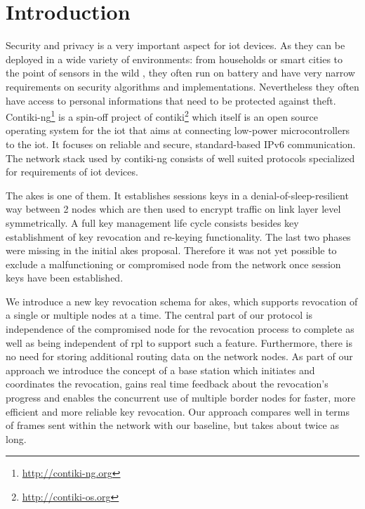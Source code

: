 \documentclass[conference]{IEEEtran}
\newcommand{\inlinetodo}[2][]{\todo[inline,caption={},#1]{#2}}
\begin{document}
\section{Introduction}\label{sec:introduction}
Security and privacy is a very important aspect for \ac{iot} devices. 
As they can be deployed in a wide variety of environments: from households or smart cities to the point of sensors in the wild \cite{DanielWerner}, they often run on battery and have very narrow requirements on security algorithms and implementations. 
Nevertheless they often have access to personal informations that need to be protected against theft. 
Contiki-ng\footnote{\url{http://contiki-ng.org}} is a spin-off project of contiki\footnote{\url{http://contiki-os.org}} which itself is an open source operating system for the \acl{iot} that aims at connecting low-power microcontrollers to the \ac{iot}.
It focuses on reliable and secure, standard-based IPv6 communication.
The network stack used by contiki-ng consists of well suited protocols specialized for requirements of \ac{iot} devices. 

The \ac{akes} \cite{krentz2018denial} is one of them.
It establishes sessions keys in a denial-of-sleep-resilient way between 2 nodes which are then used to encrypt traffic on link layer level symmetrically.
A full key management life cycle consists besides key establishment of key revocation and re-keying functionality.
The last two phases were missing in the initial \ac{akes} proposal.
Therefore it was not yet possible to exclude a malfunctioning or compromised node from the network once session keys have been established.

We introduce a new key revocation schema for \ac{akes}, which supports revocation of a single or multiple nodes at a time. 
The central part of our protocol is independence of the compromised node for the revocation process to complete as well as being independent of \ac{rpl} \cite{rfc6550} to support such a feature. 
Furthermore, there is no  need for storing additional routing data on the network nodes.
As part of our approach we introduce the concept of a base station which initiates and coordinates the revocation, gains real time feedback about the revocation's progress and enables the concurrent use of multiple border nodes for faster, more efficient and more reliable key revocation. 
Our approach compares well in terms of frames sent within the network with our baseline, but takes about twice as long.

\end{document}
